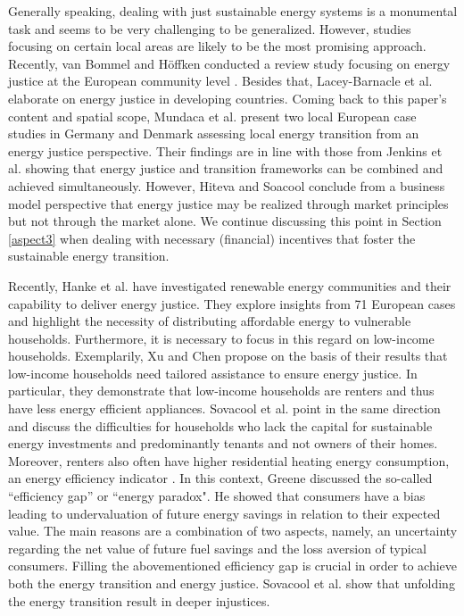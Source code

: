 Generally speaking, dealing with just sustainable energy systems is a monumental task and seems to be very challenging to be generalized. However, studies focusing on certain local areas are likely to be the most promising approach. Recently, van Bommel and Höffken conducted a review study focusing on energy justice at the European community level \cite{van2021energy}. Besides that, Lacey-Barnacle et al. \cite{lacey2020energy} elaborate on energy justice in developing countries. Coming back to this paper's content and spatial scope, Mundaca et al. \cite{mundaca2018successful} present two local European case studies in Germany and Denmark assessing local energy transition from an energy justice perspective. Their findings are in line with those from Jenkins et al. \cite{jenkins2018humanizing} showing that energy justice and transition frameworks can be combined and achieved simultaneously. However, Hiteva and Soacool \cite{hiteva2017harnessing} conclude from a business model perspective that energy justice may be realized through market principles but not through the market alone. We continue discussing this point in Section \ref{aspect3} when dealing with necessary (financial) incentives that foster the sustainable energy transition. \vspace{0.5cm} 

Recently, Hanke et al. \cite{hanke2021renewable} have investigated renewable energy communities and their capability to deliver energy justice. They explore insights from 71 European cases and highlight the necessity of distributing affordable energy to vulnerable households. Furthermore, it is necessary to focus in this regard on low-income households. Exemplarily, Xu and Chen \cite{xu2019energy} propose on the basis of their results that low-income households need tailored assistance to ensure energy justice. In particular, they demonstrate that low-income households are renters and thus have less energy efficient appliances. Sovacool et al. \cite{sovacool2019temporality} point in the same direction and discuss the difficulties for households who lack the capital for sustainable energy investments and predominantly tenants and not owners of their homes. Moreover, renters also often have higher residential heating energy consumption, an energy efficiency indicator \cite{reames2016targeting}. In this context, Greene \cite{greene2011uncertainty} discussed the so-called “efficiency gap” or “energy paradox". He showed that consumers have a bias leading to undervaluation of future energy savings in relation to their expected value. The main reasons are a combination of two aspects, namely, an uncertainty regarding the net value of future fuel savings and the loss aversion of typical consumers. Filling the abovementioned efficiency gap is crucial in order to achieve both the energy transition and energy justice. Sovacool et al. \cite{sovacool2019decarbonization} show that unfolding the energy transition result in deeper injustices.

